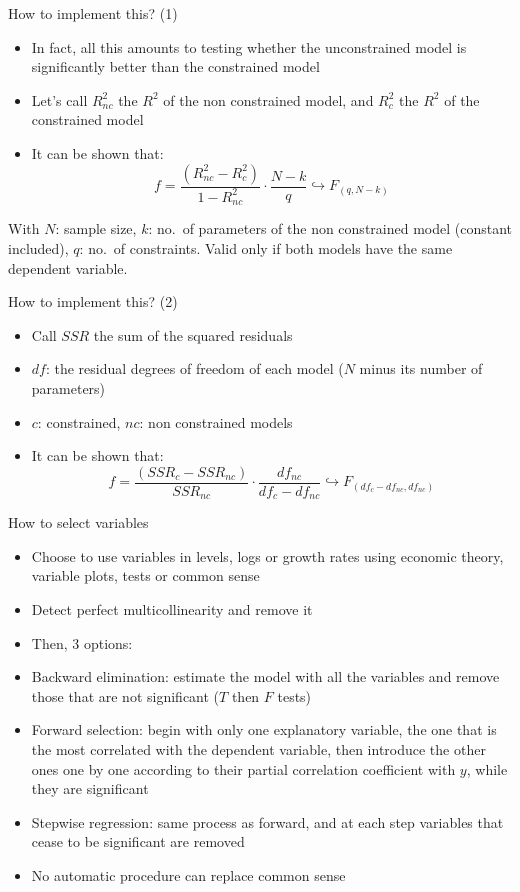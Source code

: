 \documentclass[aspectratio=169]{beamer}
\begin{document}
\begin{frame}{How to implement this? (1)}
\begin{itemize}
    \item In fact, all this amounts to testing whether the unconstrained model is significantly better than the constrained model
    \item Let's call $R_{nc}^2$ the $R^2$ of the non constrained model, and $R_c^2$ the $R^2$ of the constrained model
    \item It can be shown that:
    \[
    f = \frac{(R_{nc}^2 - R_c^2)}{1 - R_{nc}^2} \cdot \frac{N-k}{q} \hookrightarrow F_{(q,N-k)}
    \]
\end{itemize}

With $N$: sample size, $k$: no.\ of parameters of the non constrained model (constant included), $q$: no.\ of constraints. Valid only if both models have the same dependent variable.
\end{frame}

\begin{frame}{How to implement this? (2)}
\begin{itemize}
    \item Call $SSR$ the sum of the squared residuals
    \item $df$: the residual degrees of freedom of each model ($N$ minus its number of parameters)
    \item $c$: constrained, $nc$: non constrained models
    \item It can be shown that:
    \[
    f = \frac{(SSR_c - SSR_{nc})}{SSR_{nc}} \cdot \frac{df_{nc}}{df_c - df_{nc}} \hookrightarrow F_{(df_c - df_{nc}, df_{nc})}
    \]
\end{itemize}
\end{frame}

\begin{frame}{How to select variables}
\begin{itemize}
    \item Choose to use variables in levels, logs or growth rates using economic theory, variable plots, tests or common sense
    \item Detect perfect multicollinearity and remove it
    \item Then, 3 options:
    \item Backward elimination: estimate the model with all the variables and remove those that are not significant ($T$ then $F$ tests)
    \item Forward selection: begin with only one explanatory variable, the one that is the most correlated with the dependent variable, then introduce the other ones one by one according to their partial correlation coefficient with $y$, while they are significant
    \item Stepwise regression: same process as forward, and at each step variables that cease to be significant are removed
    \item No automatic procedure can replace common sense
\end{itemize}
\end{frame}
\end{document}

